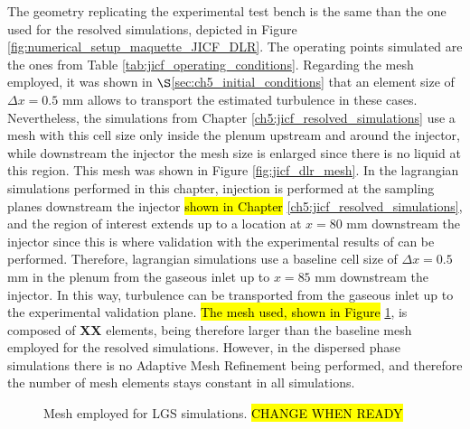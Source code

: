 The geometry replicating the experimental test bench is the same than the one used for the resolved simulations, depicted in Figure \ref{fig:numerical_setup_maquette_JICF_DLR}. The operating points simulated are the ones from Table \ref{tab:jicf_operating_conditions}. Regarding the mesh employed, it was shown in $\S$\ref{sec:ch5_initial_conditions} that an element size of $\Delta x = 0.5$ mm allows to transport the estimated turbulence in these cases. Nevertheless, the simulations from Chapter \ref{ch5:jicf_resolved_simulations} use a mesh with this cell size only inside the plenum upstream and around the injector, while downstream the injector the mesh size is enlarged since there is no liquid at this region. This mesh was shown in Figure \ref{fig:jicf_dlr_mesh}. In the lagrangian simulations performed in this chapter, injection is performed at the sampling planes downstream the injector \hl{shown in Chapter }\ref{ch5:jicf_resolved_simulations}, and the region of interest extends up to a location at $x = 80$ mm downstream the injector since this is where validation with the experimental results of  can be performed. Therefore, lagrangian simulations use a baseline cell size of $\Delta x = 0.5$ mm in the plenum from the gaseous inlet up to $x = 85$ mm downstream the injector. In this way, turbulence can be transported from the gaseous inlet  up to the experimental validation plane. \hl{The mesh used, shown in Figure} \ref{fig:jicf_dlr_mesh_LGS}, is composed of \textbf{XX} elements, being therefore larger than the baseline mesh employed for the resolved simulations. However, in the dispersed phase simulations there is no Adaptive Mesh Refinement being performed, and therefore the number of mesh elements stays constant in all simulations.


\begin{figure}[h!]
	\centering
	\caption{Mesh employed for LGS simulations. \hl{CHANGE WHEN READY}}
	\label{fig:jicf_dlr_mesh_LGS}
\end{figure}

